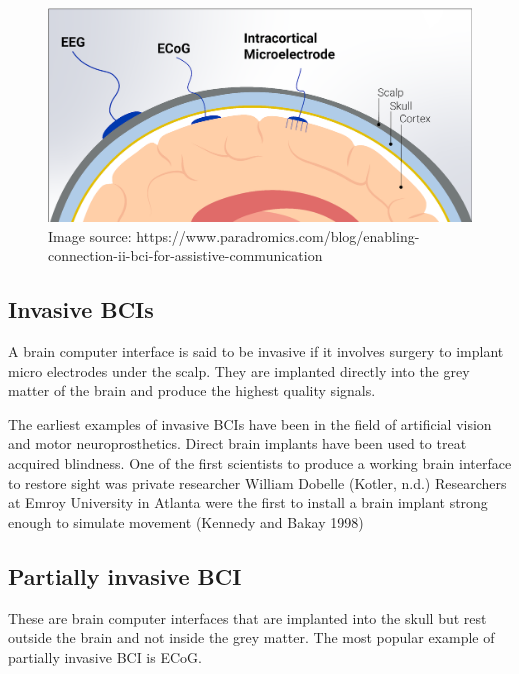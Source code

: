\documentclass[
  letterpaper,
  DIV=11,
  numbers=noendperiod]{scrreprt}
\begin{document}
\begin{figure}[H]

{\centering \includegraphics{images/65cd1a545634de6df4638f0e_6279ab07c6628c70c87853b8_WKwprEdZXs6z8tzbspUAF13_Kd1uMTjgOoUkj6JFHHzsvWTUbYqQ14ngYRgLn7moghtgD3BgTkdVztJxo7MyeEx3crcEsfs6pRA3GxlSooLQMma_ewcmbvapPqCwSFd0Ae59e0EebQRL1-Ql3w.png}

}

\caption{Image source:
https://www.paradromics.com/blog/enabling-connection-ii-bci-for-assistive-communication}

\end{figure}%

\subsection{Invasive BCIs}\label{invasive-bcis}

A brain computer interface is said to be invasive if it involves surgery
to implant micro electrodes under the scalp. They are implanted directly
into the grey matter of the brain and produce the highest quality
signals.

The earliest examples of invasive BCIs have been in the field of
artificial vision and motor neuroprosthetics. Direct brain implants have
been used to treat acquired blindness. One of the first scientists to
produce a working brain interface to restore sight was private
researcher William Dobelle (Kotler, n.d.) Researchers at Emroy
University in Atlanta were the first to install a brain implant strong
enough to simulate movement (Kennedy and Bakay 1998)

\subsection{Partially invasive BCI}\label{partially-invasive-bci}

These are brain computer interfaces that are implanted into the skull
but rest outside the brain and not inside the grey matter. The most
popular example of partially invasive BCI is ECoG.
\end{document}
